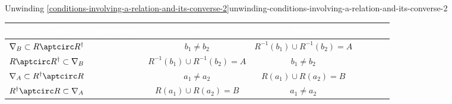 \begin{remark}{Unwinding \cref{conditions-involving-a-relation-and-its-converse-2}}{unwinding-conditions-involving-a-relation-and-its-converse-2}
\begin{envfootnotesize}
        \begingroup%
        \setlength\cellspacetoplimit{3pt}
        \setlength\cellspacebottomlimit{3pt}
        \renewcommand{\arraystretch}{1.2}
        \begin{center}
            \begin{tabular}{|Sc|Sc|Sc|Sc|}\hline{}
                \textcolor{white}{\textbf{\textsc{Inclusion}}}       & \textcolor{white}{\textbf{\textsc{Quantifier}}}         & \textcolor{white}{\textbf{\textsc{If}}} & \textcolor{white}{\textbf{\textsc{Then}}} \\\hline{}
                $\nabla_{B}           \subset R\aptcirc R^{\dagger}$ &  & $b_{1}\neq b_{2}$                       & $R^{-1}(b_{1})\cup R^{-1}(b_{2})=A$       \\
                $R\aptcirc R^{\dagger}\subset \nabla_{B}$            &  & $R^{-1}(b_{1})\cup R^{-1}(b_{2})=A$     & $b_{1}\neq b_{2}$                         \\
                $\nabla_{A}           \subset R^{\dagger}\aptcirc R$ &  & $a_{1}\neq a_{2}$                       & $R(a_{1})\cup R(a_{2})=B$                 \\
                $R^{\dagger}\aptcirc R\subset \nabla_{A}$            &  & $R(a_{1})\cup R(a_{2})=B$               & $a_{1}\neq a_{2}$                         \\\hline
            \end{tabular}
        \end{center}
        \endgroup
    \end{envfootnotesize}
\end{remark}
